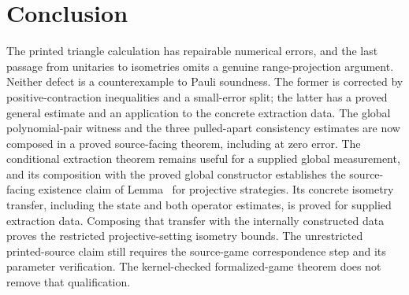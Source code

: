 \documentclass[11pt]{article}
\begin{document}
\section{Conclusion}

The printed triangle calculation has repairable numerical errors, and the
last passage from unitaries to isometries omits a genuine range-projection
argument.  Neither defect is a counterexample to Pauli soundness.  The former
is corrected by positive-contraction inequalities and a small-error split;
the latter has a proved general estimate and an application to the concrete
extraction data. The global polynomial-pair witness
and the three pulled-apart consistency estimates are now composed in a proved
source-facing theorem, including at zero error. The conditional extraction
theorem remains useful for a supplied global measurement, and its composition
with the proved global constructor establishes the source-facing existence
claim of Lemma~ for projective strategies. Its concrete
isometry transfer, including the state and both operator estimates, is proved
for supplied extraction data. Composing that transfer with the internally
constructed data proves the restricted projective-setting isometry bounds.
The unrestricted printed-source claim still requires the source-game
correspondence step and its parameter verification. The kernel-checked
formalized-game theorem does not remove that qualification.



\end{document}
